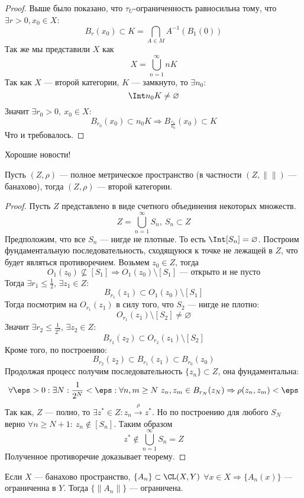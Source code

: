 \begin{proof}
	Выше было показано, что $\tau_U$-ограниченность равносильна тому, что $\exists r > 0, x_0 \in X$:
	$$
	B_r(x_0) \subset K = \bigcap_{A \in M}A^{-1}(B_1(0))
	$$
	Так же мы представили $X$ как
	$$
	X = \bigcup_{n=1}^\infty n K
	$$
	Так как $X$ --- второй категории, $K$ --- замкнуто, то $\exists n_0$:
	$$
	\Int n_0K \neq \varnothing
	$$
	Значит $\exists r_0>0, \ x_0 \in X$:
	$$
	B_{r_0}(x_0) \subset n_0 K \Rightarrow B_{\frac{r_0}{n_0}}(x_0) \subset K
	$$
	Что и требовалось.
\end{proof}
Хорошие новости!
\begin{theorem}[Бэр]\label{th:bear}
	Пусть $(Z, \rho)$ --- полное метрическое пространство (в частности $(Z, \|\|)$ --- банахово), тогда $(Z, \rho)$ --- второй категории.
\end{theorem}
\begin{proof}
	Пусть $Z$ представлено в виде счетного объединения некоторых множеств.
	$$
	Z = \bigcup_{n=1}^\infty S_n , \ S_n \subset Z
	$$
	Предположим, что все $S_n$ --- нигде не плотные. То есть $\Int [S_n] = \varnothing$. 
	Построим фундаментальную последовательность, сходящуюся к точке не лежащей в $Z$, что будет являться противоречием. Возьмем $z_0 \in Z$, тогда
	$$
	O_1(z_0) \nsubseteq [S_1] \Rightarrow O_1(z_0)\setminus [S_1] \text{ --- открыто и не пусто}
	$$
	Тогда $\exists r_1 \leq \frac{1}{2}$, $\exists z_1 \in Z$:
	$$
	B_{r_1}(z_1) \subset O_1(z_0)\setminus [S_1]
	$$
	Тогда посмотрим на $O_{r_1}(z_1)$ в силу того, что $S_2$ --- нигде не плотно:
	$$
	O_{r_1}(z_1) \setminus [S_2] \neq \varnothing
	$$
	Значит $\exists r_2 \leq \displaystyle \frac{1}{2^2}$, $\exists z_2 \in Z$:
	$$
	B_{r_2}(z_2) \subset O_{r_2}(z_1) \setminus [S_2]
	$$
	Кроме того, по построению:
	$$
	B_{r_2}(z_2) \subset B_{r_1}(z_1) \subset B_{r_0}(z_0)
	$$
	Продолжая процесс получим последовательность $\{z_n\} \subset Z$, она фундаментальна:
	$$
	\forall \eps > 0: \exists N: \frac{1}{2^N} < \eps: \forall n, m \geq N \ z_n,z_m \in B_{r_N}(z_N) \Rightarrow \rho(z_n,z_m) < \eps
	$$ 
	Так как, $Z$ --- полно, то $\exists z^* \in Z: z_n \xrightarrow{\rho} z^*$. Но по построению для любого $S_N$ верно $\forall n \geq N + 1: \ z_n \notin [S_n]$. Таким образом
	$$
	z^* \notin \bigcup_{n=1}^\infty S_n = Z
	$$
	Полученное противоречие доказывает теорему.
\end{proof}
\begin{next1}
	Если $X$ --- банахово пространство, $\{A_n\} \subset \CL(X, Y)$ $\forall x \in X \Rightarrow \{A_n(x)\}$ --- ограниченна в $Y$. Тогда $\{\|A_n\|\}$ --- ограничена.
\end{next1}
